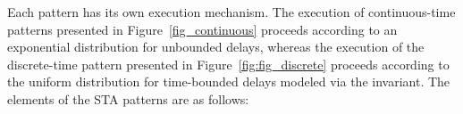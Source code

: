 Each pattern has its own execution mechanism. The execution of continuous-time patterns presented in Figure~\ref{fig_continuous} proceeds according to an exponential distribution for unbounded delays, whereas the execution of the discrete-time pattern presented in Figure~\ref{fig:fig_discrete} proceeds according to the uniform distribution for time-bounded delays modeled via the invariant.
The elements of the STA patterns are as follows:
%	

